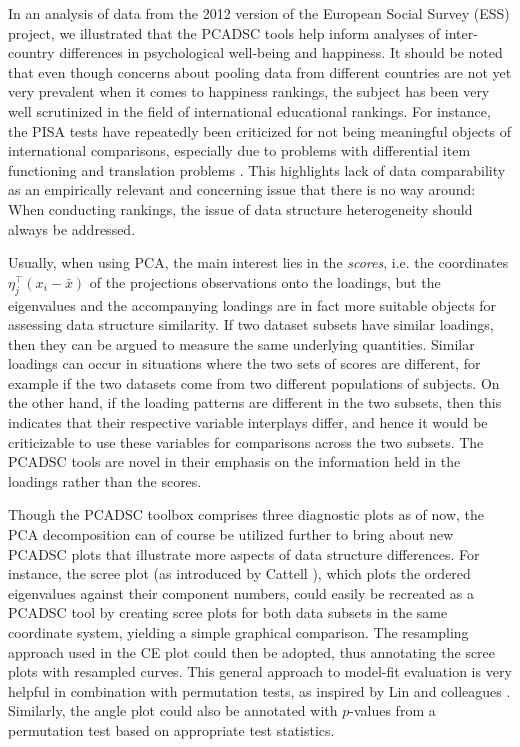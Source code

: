 \documentclass[a4paper,12pt]{article}
\begin{document}
In an analysis of data from the 2012 version of the European Social Survey (ESS) project, we illustrated that the PCADSC tools help inform analyses of inter-country differences in psychological well-being and happiness. It should be noted that even though concerns about pooling data from different countries are not yet very prevalent when it comes to happiness rankings, the subject has been very well scrutinized in the field of international educational rankings. For instance, the PISA tests have repeatedly been criticized for not being meaningful objects of international comparisons, especially due to problems with differential item functioning \cite{Kankaras2014,Kreiner2014,ZwitserEtAl2017} and translation problems \cite{Asil2016}. This highlights lack of data comparability as an empirically relevant and concerning issue that there is no way around: When conducting rankings, the issue of data structure heterogeneity should always be addressed.

Usually, when using PCA, the main interest lies in the \textit{scores}, i.e. the coordinates $\eta_j^\top (x_i - \bar{x})$ of the projections observations onto the loadings, but the eigenvalues and the accompanying loadings are in fact more suitable objects for assessing data structure similarity. If two dataset subsets have similar loadings, then they can be argued to measure the same underlying quantities. Similar loadings can occur in situations where the two sets of scores are different, for example if the two datasets come from two different populations of subjects. On the other hand, if the loading patterns are different in the two subsets, then this indicates that their respective variable interplays differ, and hence it would be criticizable to use these variables for comparisons across the two subsets. The PCADSC tools are novel in their emphasis on the information held in the loadings rather than the scores. 

Though the PCADSC toolbox comprises three diagnostic plots as of now, the PCA decomposition can of course be utilized further to bring about new PCADSC plots that illustrate more aspects of data structure differences. For instance, the scree plot (as introduced by Cattell \cite{Cattell1966}), which plots the ordered eigenvalues against their component numbers, could easily be recreated as a PCADSC tool by creating scree plots for both data subsets in the same coordinate system, yielding a simple graphical comparison. The resampling approach used in the CE plot could then be adopted, thus annotating the scree plots with resampled curves. This general approach to model-fit evaluation is very helpful in combination with permutation tests, as inspired by Lin and colleagues \cite{LinEtAl2002}. Similarly, the angle plot could also be annotated with $p$-values from a permutation test based on appropriate test statistics.
\end{document}
